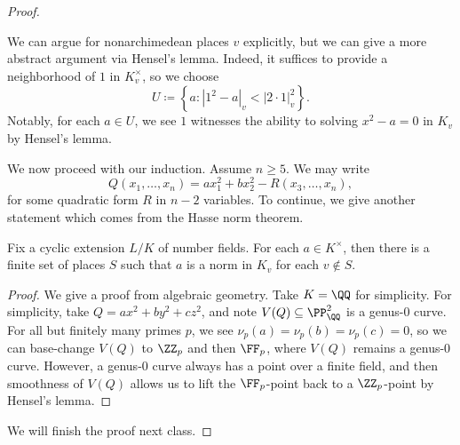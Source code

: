 \documentclass[../notes.tex]{subfiles}
\begin{document}
\begin{proof}
\begin{itemize}
		We can argue for nonarchimedean places $v$ explicitly, but we can give a more abstract argument via Hensel's lemma. Indeed, it suffices to provide a neighborhood of $1$ in $K_v^\times$, so we choose
		\[U\coloneqq\left\{a:\left|1^2-a\right|_v<|2\cdot1|_v^2\right\}.\]
		Notably, for each $a\in U$, we see $1$ witnesses the ability to solving $x^2-a=0$ in $K_v$ by Hensel's lemma.
	\end{itemize}
	We now proceed with our induction. Assume $n\ge 5$. We may write
	\[Q(x_1,\ldots,x_n)=ax_1^2+bx_2^2-R(x_3,\ldots,x_n),\]
	for some quadratic form $R$ in $n-2$ variables. To continue, we give another statement which comes from the Hasse norm theorem.
	\begin{theorem}
		Fix a cyclic extension $L/K$ of number fields. For each $a\in K^\times$, then there is a finite set of places $S$ such that $a$ is a norm in $K_v$ for each $v\notin S$.
	\end{theorem}
	\begin{proof}
		We give a proof from algebraic geometry. Take $K=\QQ$ for simplicity. For simplicity, take $Q=ax^2+by^2+cz^2$, and note $V(Q)\subseteq\PP^2_\QQ$ is a genus-$0$ curve. For all but finitely many primes $p$, we see $\nu_p(a)=\nu_p(b)=\nu_p(c)=0$, so we can base-change $V(Q)$ to $\ZZ_p$ and then $\FF_p$, where $V(Q)$ remains a genus-$0$ curve. However, a genus-$0$ curve always has a point over a finite field, and then smoothness of $V(Q)$ allows us to lift the $\FF_p$-point back to a $\ZZ_p$-point by Hensel's lemma.
	\end{proof}
	We will finish the proof next class.
\end{proof}
\end{document}
